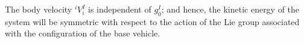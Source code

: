\documentclass[lettersize,journal]{IEEEtran}
\theoremstyle{remark}
\begin{document}
The body velocity $^iV^I_i$ is independent of ${g^I_0}$; and hence, the kinetic energy of the system will be symmetric with respect to the action of the Lie group associated with the configuration of the base vehicle. %

\end{document}

